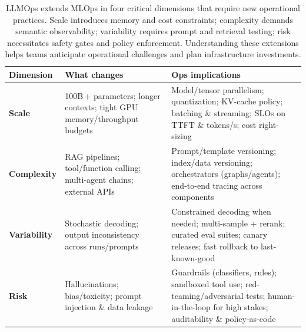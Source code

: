 \begin{table}[t]
\centering
\small
\caption{LLMOps extends MLOps in four critical dimensions that require new operational practices. Scale introduces memory and cost constraints; complexity demands semantic observability; variability requires prompt and retrieval testing; risk necessitates safety gates and policy enforcement. Understanding these extensions helps teams anticipate operational challenges and plan infrastructure investments.}
\label{tab:ch01_llmops_extends_mlops}
\setlength{\tabcolsep}{6pt}
\renewcommand{\arraystretch}{1.3}
\begin{threeparttable}
\begin{tabularx}{\linewidth}{@{}>{\raggedright\arraybackslash}p{20mm}>{\raggedright\arraybackslash}X>{\raggedright\arraybackslash}X@{}}
\toprule
\rowcolor{gray!15}
\textbf{Dimension} & \textbf{What changes} & \textbf{Ops implications} \\
\midrule
\textbf{Scale} &
100B\,+ parameters; longer contexts; tight GPU memory/throughput budgets &
Model/tensor parallelism; quantization; KV-cache policy; batching \& streaming; SLOs on TTFT \& tokens/s; cost right-sizing \\
\addlinespace[0.6em]
\textbf{Complexity} &
RAG pipelines; tool/function calling; multi-agent chains; external APIs &
Prompt/template versioning; index/data versioning; orchestrators (graphs/agents); end-to-end tracing across components \\
\addlinespace[0.6em]
\textbf{Variability} &
Stochastic decoding; output inconsistency across runs/prompts &
Constrained decoding when needed; multi-sample + rerank; curated eval suites; canary releases; fast rollback to last-known-good \\
\addlinespace[0.6em]
\textbf{Risk} &
Hallucinations; bias/toxicity; prompt injection \& data leakage &
Guardrails (classifiers, rules); sandboxed tool use; red-teaming/adversarial tests; human-in-the-loop for high stakes; auditability \& policy-as-code \\
\bottomrule
\end{tabularx}
\end{threeparttable}
\end{table}

